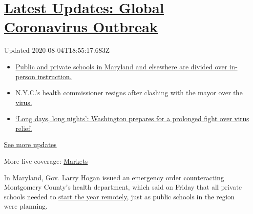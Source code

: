 \hypertarget{latest-updates-global-coronavirus-outbreak}{%
\section{\texorpdfstring{\href{https://www.nytimes.com/2020/08/04/world/coronavirus-cases.html?action=click\&pgtype=Article\&state=default\&region=MAIN_CONTENT_1\&context=storylines_live_updates}{Latest
Updates: Global Coronavirus
Outbreak}}{Latest Updates: Global Coronavirus Outbreak}}\label{latest-updates-global-coronavirus-outbreak}}

Updated 2020-08-04T18:55:17.683Z

\begin{itemize}
\tightlist
\item
  \href{https://www.nytimes.com/2020/08/04/world/coronavirus-cases.html?action=click\&pgtype=Article\&state=default\&region=MAIN_CONTENT_1\&context=storylines_live_updates\#link-4825b93}{Public
  and private schools in Maryland and elsewhere are divided over
  in-person instruction.}
\item
  \href{https://www.nytimes.com/2020/08/04/world/coronavirus-cases.html?action=click\&pgtype=Article\&state=default\&region=MAIN_CONTENT_1\&context=storylines_live_updates\#link-4d1eafa8}{N.Y.C.'s
  health commissioner resigns after clashing with the mayor over the
  virus.}
\item
  \href{https://www.nytimes.com/2020/08/04/world/coronavirus-cases.html?action=click\&pgtype=Article\&state=default\&region=MAIN_CONTENT_1\&context=storylines_live_updates\#link-6b644638}{`Long
  days, long nights': Washington prepares for a prolonged fight over
  virus relief.}
\end{itemize}

\href{https://www.nytimes.com/2020/08/04/world/coronavirus-cases.html?action=click\&pgtype=Article\&state=default\&region=MAIN_CONTENT_1\&context=storylines_live_updates}{See
more updates}

More live coverage:
\href{https://www.nytimes.com/live/2020/08/04/business/stock-market-today-coronavirus?action=click\&pgtype=Article\&state=default\&region=MAIN_CONTENT_1\&context=storylines_live_updates}{Markets}

In Maryland, Gov. Larry Hogan
\href{https://twitter.com/GovLarryHogan/status/1290330304830246912}{issued
an emergency order} counteracting Montgomery County's health department,
which said on Friday that all private schools needed to
\href{https://www.washingtonpost.com/local/education/montgomery-county-health-officials-tell-private-schools-to-start-school-online/2020/08/01/64552b9e-d3fd-11ea-9038-af089b63ac21_story.html}{start
the year remotely}, just as public schools in the region were planning.

